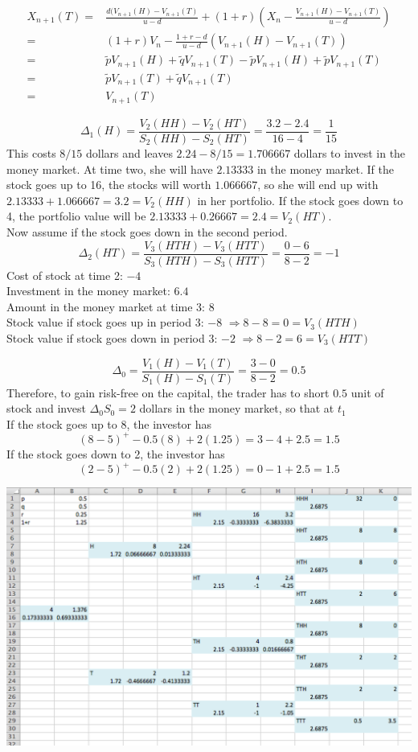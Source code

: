 \documentclass[12pt]{article}
\newenvironment{exercise}[2][Exercise]{\begin{trivlist}
		\item[\hskip \labelsep {\bfseries #1}\hskip \labelsep {\bfseries #2.}]}{\end{trivlist}}
\begin{document}
	\begin{align*}X_{n+1}(T) =& \frac{d(V_{n+1}(H)-V_{n+1}(T)}{u-d} +(1+r)\left(X_n-\frac{V_{n+1}(H)-V_{n+1}(T)}{u-d}\right)\\
	=&(1+r)V_n - \frac{1+r-d}{u-d}(V_{n+1}(H)-V_{n+1}(T))\\
	=&\tilde{p}V_{n+1}(H)+\tilde{q}V_{n+1}(T)-\tilde{p}V_{n+1}(H)+\tilde{p}V_{n+1}(T)\\
	=&\tilde{p}V_{n+1}(T)+\tilde{q}V_{n+1}(T)\\
	=&V_{n+1}(T)
	\end{align*}
	\begin{exercise}{5}\end{exercise}
	$$\Delta_1(H)=\frac{V_2(HH)-V_2(HT)}{S_2(HH)-S_2(HT)}=\frac{3.2-2.4}{16-4}=\frac{1}{15}$$
	This costs $8/15$ dollars and leaves $2.24-8/15 = 1.706667$ dollars to invest in the money market. At time two, she will have $2.13333$ in the money market. If the stock goes up to 16, the stocks will worth $1.066667$, so she will end up with $2.13333+1.066667 = 3.2 = V_2(HH)$ in her portfolio. If the stock goes down to 4, the portfolio value will be $2.13333+0.26667 = 2.4 = V_2(HT)$.\\
	Now assume if the stock goes down in the second period.
	$$\Delta_2(HT) = \frac{V_3(HTH) - V_3(HTT)}{S_3(HTH) -S_3(HTT)} = \frac{0-6}{8-2}=-1$$
	Cost of stock at time 2: $-4$\\
	Investment in the money market: $6.4$\\
	Amount in the money market at time 3: $8$\\
	Stock value if stock goes up in period 3: $-8$ $\Rightarrow  8-8 = 0=V_3(HTH)$\\
	Stock value if stock goes down in period 3: $-2$ $\Rightarrow  8-2 = 6=V_3(HTT) $\\
	\begin{exercise}{6}\end{exercise}
	$$\Delta_0 = \frac{V_1(H)-V_1(T)}{S_1(H) - S_1(T)}=\frac{3-0}{8-2} = 0.5$$
	Therefore, to gain risk-free on the capital, the trader has to short $0.5$ unit of stock and invest $\Delta_0S_0 = 2$ dollars in the money market, so that at $t_1$\\
	If the stock goes up to 8, the investor has
	$$(8-5)^+-0.5(8)+2(1.25) = 3-4+2.5 = 1.5$$
	If the stock goes down to 2, the investor has
	$$(2-5)^+-0.5(2)+2(1.25) = 0-1+2.5 = 1.5$$
	\begin{exercise}{7}\end{exercise}
	\includegraphics[scale=0.6]{Ex1_7.png}
\end{document}
